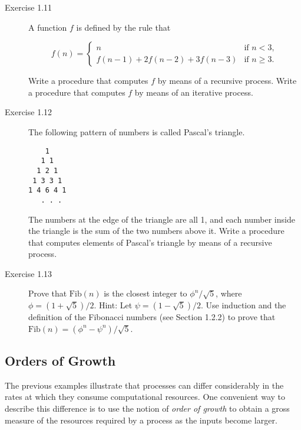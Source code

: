 \begin{description}
\item[Exercise 1.11] A function $f$ is defined by the rule that

\begin{equation}
f(n) = \begin{cases}
n & \text{if } n < 3, \\
f(n - 1) + 2f(n - 2) + 3f(n - 3) & \text{if } n \geq 3.
\end{cases}
\end{equation}

Write a procedure that computes $f$ by means of a recursive process. Write a procedure that computes $f$ by means of an iterative process.

\item[Exercise 1.12] The following pattern of numbers is called Pascal's triangle.

\begin{verbatim}
    1
   1 1
  1 2 1
 1 3 3 1
1 4 6 4 1
   . . .
\end{verbatim}

The numbers at the edge of the triangle are all 1, and each number inside the triangle is the sum of the two numbers above it. Write a procedure that computes elements of Pascal's triangle by means of a recursive process.

\item[Exercise 1.13] Prove that $\text{Fib}(n)$ is the closest integer to $\phi^n/\sqrt{5}$, where $\phi = (1 + \sqrt{5})/2$. Hint: Let $\psi = (1 - \sqrt{5})/2$. Use induction and the definition of the Fibonacci numbers (see Section 1.2.2) to prove that $\text{Fib}(n) = (\phi^n - \psi^n)/\sqrt{5}$.
\end{description}

\subsection{Orders of Growth}

The previous examples illustrate that processes can differ considerably in the rates at which they consume computational resources. One convenient way to describe this difference is to use the notion of \emph{order of growth} to obtain a gross measure of the resources required by a process as the inputs become larger.

